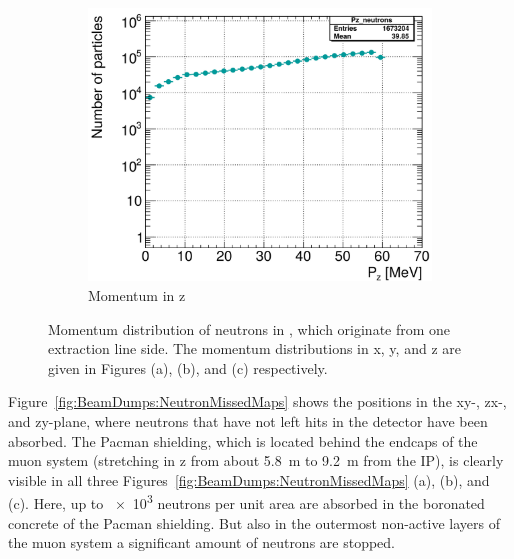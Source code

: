\begin{figure}[h]
\begin{subfigure}[b]{0.32\textwidth}
   \centering
    \includegraphics[width=\textwidth]{Figures/BeamDump/neutrons_Pz.png}
   \caption{Momentum in z}
   \end{subfigure}
   \caption[Beam dump neutron momenta in \sid]{Momentum distribution of neutrons in \sid, which originate from one extraction line side.
   The momentum distributions in x, y, and z are given in Figures (a), (b), and (c) respectively.}
   \label{fig:BeamDumps:NeutronMom}
\end{figure} 
Figure~\ref{fig:BeamDumps:NeutronMissedMaps} shows the positions in the xy-, zx-, and zy-plane, where neutrons that have not left hits in the \sid detector have been absorbed.
The Pacman shielding, which is located behind the endcaps of the \sid muon system (stretching in z from about \SI{5.8}{\meter} to \SI{9.2}{\meter} from the IP), is clearly visible in all three Figures~\ref{fig:BeamDumps:NeutronMissedMaps} (a), (b), and (c).
Here, up to \num{e3} neutrons per unit area are absorbed in the boronated concrete of the Pacman shielding.
But also in the outermost non-active layers of the \sid muon system a significant amount of neutrons are stopped.
